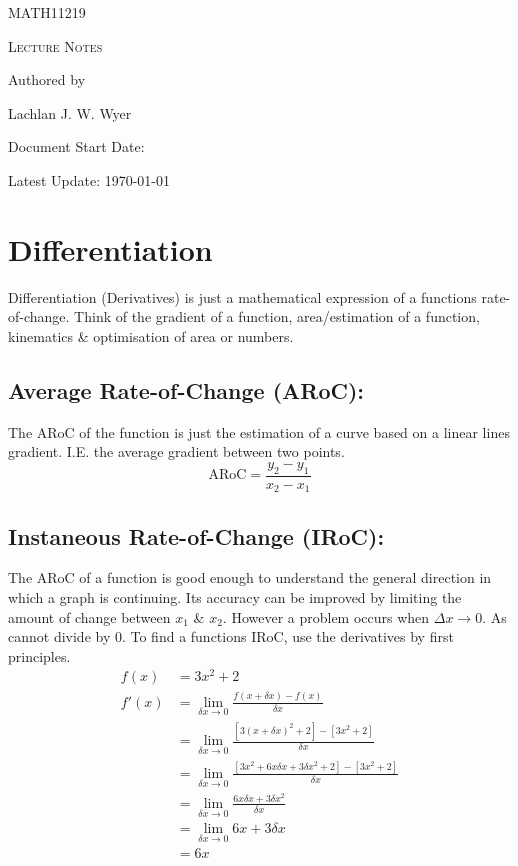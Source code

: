 \documentclass[a5paper]{article}
\date{27\textsuperscript{th} of Jan 2026}
\begin{document}
	\begin{titlepage}
		\centering
		{\Huge \textsc{MATH11219}\par}
		\vspace{1cm}
		{\Large \textsc{Lecture Notes}\par}
		\vspace{2.5cm}
		\vfill
		Authored by\par
		Lachlan J. W. Wyer
		\vfill
		\makeatletter
		{\large Document Start Date: \@date \par}
		\makeatother
		{\large Latest Update: \today\par}
	\end{titlepage}
	\tableofcontents
	\pagebreak

	\section{Differentiation}
	Differentiation (Derivatives) is just a mathematical expression of a functions rate-of-change. Think of the gradient of a function, area/estimation of a function, kinematics \& optimisation of area or numbers.
	\subsection{Average Rate-of-Change (ARoC):}
	The ARoC of the function is just the estimation of a curve based on a linear lines gradient. I.E. the average gradient between two points.
	$$\text{ARoC}=\frac{y_{2}-y_{1}}{x_{2}-x_{1}}$$
	\subsection{Instaneous Rate-of-Change (IRoC):}
	The ARoC of a function is good enough to understand the general direction in which a graph is continuing. Its accuracy can be improved by limiting the amount of change between $x_{1}$ \& $x_{2}$. However a problem occurs when $\Delta x\rightarrow0$. As cannot divide by 0. To find a functions IRoC, use the derivatives by first principles.
	\begin{align*}
		f(x)&=3x^{2}+2\\
		f'(x)&=\lim_{\delta x \to 0}\frac{f(x+\delta x)-f(x)}{\delta x}\\
		     &=\lim_{\delta x \to 0}\frac{[3(x+\delta x)^{2}+2]-[3x^{2}+2]}{\delta x}\\
		     &=\lim_{\delta x \to 0}\frac{[3x^{2}+6x\delta x+3\delta x^{2}+2]-[3x^{2}+2]}{\delta x}\\
		     &=\lim_{\delta x \to 0}\frac{6x\delta x+3\delta x^{2}}{\delta x}\\
		     &=\lim_{\delta x \to 0}6x+3\delta x\\
		     &=6x
	\end{align*}
\end{document}
